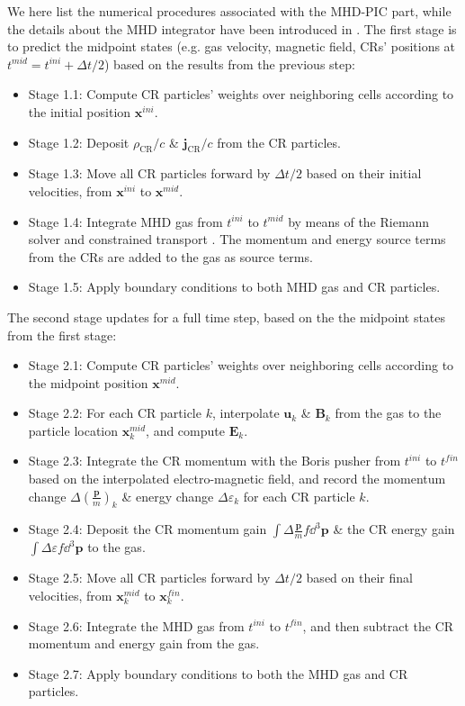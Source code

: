 \documentclass[fleqn,usenatbib]{mnras}
\begin{document}
We here list the numerical procedures associated with the MHD-PIC part, while the details about the MHD integrator have been introduced in \citet{2020ApJS..249....4S}. The first stage is to predict the midpoint states (e.g. gas velocity, magnetic field, CRs' positions at $t^{mid}= t^{ini}+\Delta t/2$) based on the results from the previous step:
\begin{itemize}
    \item Stage 1.1: Compute CR particles' weights over neighboring cells according to the initial position $\boldsymbol{x}^{ini}$.
    \item Stage 1.2: Deposit $\rho_\text{CR} / c$ \& $\boldsymbol{j}_\text{CR}/ c$ from the CR particles.
    \item Stage 1.3: Move all CR particles forward by $\Delta t/2$ based on their initial velocities, from $\boldsymbol{x}^{ini}$ to $\boldsymbol{x}^{mid}$.
    \item Stage 1.4: Integrate MHD gas from $t^{ini}$ to $t^{mid}$ by means of the Riemann solver and constrained transport \citep{2005JCoPh.205..509G, 2008JCoPh.227.4123G, 2020ApJS..249....4S}. The momentum and energy source terms from the CRs are added to the gas as source terms.
    \item Stage 1.5: Apply boundary conditions to both MHD gas and CR particles.
\end{itemize}
The second stage updates for a full time step, based on the the midpoint states from the first stage:
\begin{itemize}
    \item Stage 2.1: Compute CR particles' weights over neighboring cells according to the midpoint position $\boldsymbol{x}^{mid}$.
    \item Stage 2.2: For each CR particle $k$, interpolate $\boldsymbol{u}_k$ \& $\boldsymbol{B}_k$ from the gas to the particle location $\boldsymbol{x}_k^{mid}$, and compute $\boldsymbol{E}_k$.
    \item Stage 2.3: Integrate the CR momentum with the Boris pusher from $t^{ini}$ to $t^{fin}$ based on the interpolated electro-magnetic field, and record the momentum change $\Delta \left(\frac{\boldsymbol{p}}{m}\right)_k$ \& energy change $\Delta \varepsilon_k$ for each CR particle $k$. 
    \item Stage 2.4: Deposit the CR momentum gain $\int \Delta \frac{\boldsymbol{p}}{m} f \dd^3 \boldsymbol{p}$ \& the CR energy gain $\int \Delta \varepsilon f \dd^3 \boldsymbol{p}$ to the gas.
    \item Stage 2.5: Move all CR particles forward by $\Delta t/2$ based on their final velocities, from $\boldsymbol{x}_k^{mid}$ to $\boldsymbol{x}_k^{fin}$.
    \item Stage 2.6: Integrate the MHD gas from $t^{ini}$ to $t^{fin}$, and then subtract the CR momentum and energy gain from the gas.
    \item Stage 2.7: Apply boundary conditions to both the MHD gas and CR particles.
\end{itemize}
\end{document}
